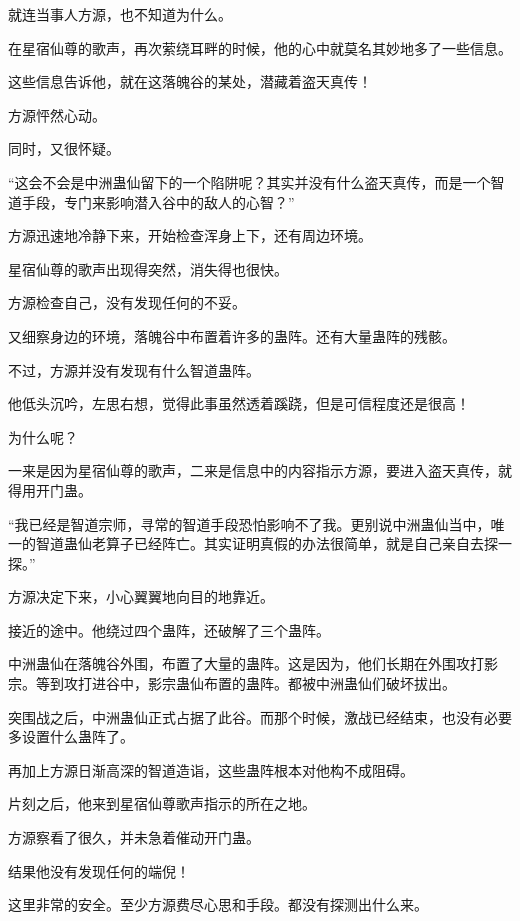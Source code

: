 
\begin{this_body}

就连当事人方源，也不知道为什么。

在星宿仙尊的歌声，再次萦绕耳畔的时候，他的心中就莫名其妙地多了一些信息。

这些信息告诉他，就在这落魄谷的某处，潜藏着盗天真传！

方源怦然心动。

同时，又很怀疑。

“这会不会是中洲蛊仙留下的一个陷阱呢？其实并没有什么盗天真传，而是一个智道手段，专门来影响潜入谷中的敌人的心智？”

方源迅速地冷静下来，开始检查浑身上下，还有周边环境。

星宿仙尊的歌声出现得突然，消失得也很快。

方源检查自己，没有发现任何的不妥。

又细察身边的环境，落魄谷中布置着许多的蛊阵。还有大量蛊阵的残骸。

不过，方源并没有发现有什么智道蛊阵。

他低头沉吟，左思右想，觉得此事虽然透着蹊跷，但是可信程度还是很高！

为什么呢？

一来是因为星宿仙尊的歌声，二来是信息中的内容指示方源，要进入盗天真传，就得用开门蛊。

“我已经是智道宗师，寻常的智道手段恐怕影响不了我。更别说中洲蛊仙当中，唯一的智道蛊仙老算子已经阵亡。其实证明真假的办法很简单，就是自己亲自去探一探。”

方源决定下来，小心翼翼地向目的地靠近。

接近的途中。他绕过四个蛊阵，还破解了三个蛊阵。

中洲蛊仙在落魄谷外围，布置了大量的蛊阵。这是因为，他们长期在外围攻打影宗。等到攻打进谷中，影宗蛊仙布置的蛊阵。都被中洲蛊仙们破坏拔出。

突围战之后，中洲蛊仙正式占据了此谷。而那个时候，激战已经结束，也没有必要多设置什么蛊阵了。

再加上方源日渐高深的智道造诣，这些蛊阵根本对他构不成阻碍。

片刻之后，他来到星宿仙尊歌声指示的所在之地。

方源察看了很久，并未急着催动开门蛊。

结果他没有发现任何的端倪！

这里非常的安全。至少方源费尽心思和手段。都没有探测出什么来。


\end{this_body}
